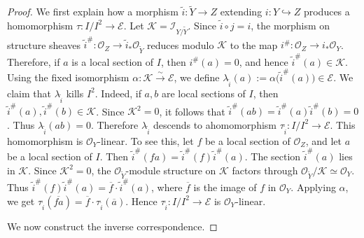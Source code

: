 \documentclass[11pt,twoside]{amsart}
\theoremstyle{plain}
\numberwithin{equation}{section}
\theoremstyle{definition}
\begin{document}
\begin{proof}
We first explain how a morphism \(\widetilde i:\widetilde Y\to Z\) extending
\(i:Y\hookrightarrow Z\) produces a homomorphism \(\tau:I/I^2\to \mathcal E\).
Let \(\mathcal K=\mathcal I_{Y/\widetilde Y}\). Since \(\widetilde i\circ j=i\), the
morphism on structure sheaves \(\widetilde i^\#:\mathcal O_Z\to \widetilde i_*\mathcal O_{\widetilde Y}\) reduces modulo \(\mathcal K\) to the map \(i^\#:\mathcal O_Z\to i_*\mathcal O_Y\). Therefore, if \(a\) is a local section of \(I\), then \(i^\#(a)=0\), and hence \(\widetilde i^\#(a)\in \mathcal K\). Using the fixed isomorphism \(\alpha:\mathcal K\xrightarrow{\sim}\mathcal E\), we define
\(\lambda_{\widetilde i}(a):=\alpha\bigl(\widetilde i^\#(a)\bigr)\in \mathcal E\).
We claim that \(\lambda_{\widetilde i}\) kills \(I^2\). Indeed, if \(a,b\) are local
sections of \(I\), then \(\widetilde i^\#(a),\widetilde i^\#(b)\in \mathcal K\).
Since \(\mathcal K^2=0\), it follows that \(\widetilde i^\#(ab)=\widetilde i^\#(a)\widetilde i^\#(b)=0\). Thus \(\lambda_{\widetilde i}(ab)=0\). Therefore \(\lambda_{\widetilde i}\) descends to ahomomorphism \(\tau_{\widetilde i}:I/I^2\to \mathcal E\). This homomorphism is \(\mathcal O_Y\)-linear. To see this, let \(f\) be a local section of \(\mathcal O_Z\), and let \(a\) be a local section of \(I\). Then \(\widetilde i^\#(fa)=\widetilde i^\#(f)\widetilde i^\#(a)\). The section \(\widetilde i^\#(a)\) lies in \(\mathcal K\). Since \(\mathcal K^2=0\), the
\(\mathcal O_{\widetilde Y}\)-module structure on \(\mathcal K\) factors through
\(\mathcal O_{\widetilde Y}/\mathcal K\simeq\mathcal O_Y\). Thus
\(\widetilde i^\#(f)\widetilde i^\#(a)=\overline f\cdot \widetilde i^\#(a)\),
where \(\overline f\) is the image of \(f\) in \(\mathcal O_Y\). Applying \(\alpha\), we get \(\tau_{\widetilde i}(\overline{fa})=\overline f\cdot \tau_{\widetilde i}(\overline a)\). Hence \(\tau_{\widetilde i}:I/I^2\to\mathcal E\) is \(\mathcal O_Y\)-linear. 

We now construct the inverse correspondence.


\end{proof}
\end{document}

